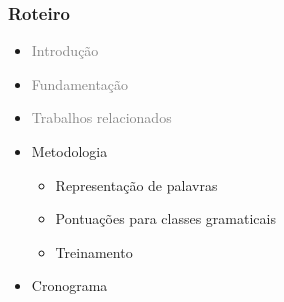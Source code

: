 \documentclass[10pt]{beamer}
\begin{document}
\begin{frame}
  \frametitle{Roteiro}


  \begin{itemize}

  \vspace{-1em}

    
    \item[\color{gray}{$\bullet$}] \textcolor{gray}{Introdução}
    
    \begin{itemize}
    \end{itemize}


    
    \item[\color{gray}{$\bullet$}] \textcolor{gray}{Fundamentação}

    \begin{itemize}
      \color{gray}{
      \item[\ ] Aprendizado de máquina
      \item[\ ] Córpus
      \item[\ ] Representação de palavras
      \item[\ ] Redes neurais
      \item[\ ] Aprendizagem profunda
      }
    \end{itemize}

    
    \item[\color{gray}{$\bullet$}] \textcolor{gray}{Trabalhos relacionados}

    \item Metodologia

    \begin{itemize}
      \item[\ ] Representação de palavras
      \item[\ ] Pontuações para classes gramaticais
      \item[\ ] Treinamento
    \end{itemize}

    \color{gray}
    \item[\color{gray}{$\bullet$}] Cronograma

  \end{itemize}

\end{frame}
\end{document}
